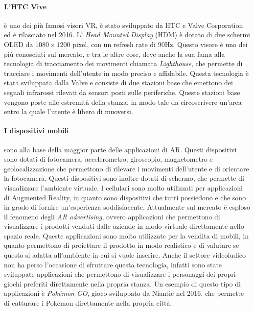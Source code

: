         \paragraph{L'HTC Vive} è uno dei più famosi visori VR, è stato sviluppato da HTC e Valve Corporation ed è
            rilasciato nel 2016. L' \textit{Head Mounted Display} (HDM) è dotato di due schermi OLED da $1080\times1200$ pixel, 
            con un refresh rate di 90Hz\cite{Vive}. Questo visore è uno dei più conosciuti sul mercato, 
            e tra le altre cose, deve anche la sua fama alla tecnologia di tracciamento dei movimenti chiamata \textit{Lighthouse}, che permette di tracciare
            i movimenti dell'utente in modo preciso e affidabile. Questa tecnologia è stata sviluppata dalla Valve
            e consiste di due stazioni base che emettono dei segnali infrarossi rilevati da sensori posti 
            sulle periferiche. Queste stazioni base vengono poste alle estremità della stanza, in modo tale da circoscrivere
            un'area entro la quale l'utente è libero di muoversi.

        \paragraph{I dispositivi mobili} sono alla base della maggior parte delle applicazioni di AR. Questi dispositivi
            sono dotati di fotocamera, accelerometro, giroscopio, magnetometro e geolocalizzazione che permettono di rilevare i movimenti
            dell'utente e di orientare la fotocamera. Questi dispositivi sono inoltre dotati di schermo, che permette di
            visualizzare l'ambiente virtuale. I cellulari sono molto utilizzati per applicazioni di Augmented Reality, in quanto
            sono dispositivi che tutti possiedono e che sono in grado di fornire un'esperienza soddisfacente.
            Attualmente sul mercato è esploso il fenomeno degli \textit{AR advertising}, ovvero applicazioni che permettono
            di visualizzare i prodotti venduti dalle aziende in modo virtuale direttamente nello spazio reale. Queste applicazioni
            sono molto utilizzate per la vendita di mobili, in quanto permettono di proiettare il prodotto in modo realistico
            e di valutare se questo si adatta all'ambiente in cui si vuole inserire. Anche il settore videoludico non ha 
            perso l'occasione di sfruttare questa tecnologia, infatti sono state sviluppate applicazioni che permettono di
            visualizzare i personaggi dei propri giochi preferiti direttamente nella propria stanza. Un esempio di questo
            tipo di applicazioni è \textit{Pokémon GO}, gioco sviluppato da Niantic nel 2016, che permette di catturare i
            Pokémon direttamente nella propria città.
            
